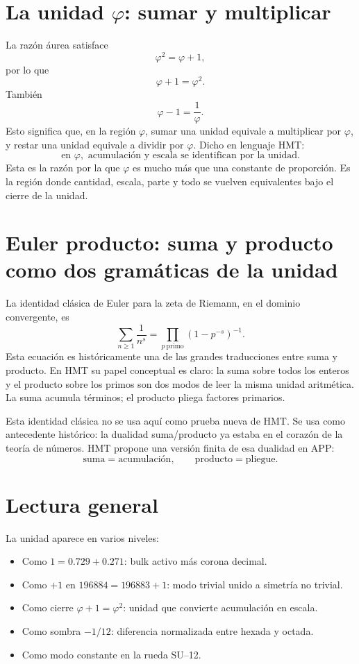 \documentclass[11pt,a4paper]{article}
\begin{document}
\section{La unidad \(\varphi\): sumar y multiplicar}
La raz\'on \'aurea satisface
\[
\varphi^2=\varphi+1,
\]
por lo que
\[
\boxed{\varphi+1=\varphi^2.}
\]
Tambi\'en
\[
\varphi-1=\frac1\varphi.
\]
Esto significa que, en la regi\'on \(\varphi\), sumar una unidad equivale a multiplicar por \(\varphi\), y restar una unidad equivale a dividir por \(\varphi\). Dicho en lenguaje HMT:
\[
\boxed{\text{en }\varphi,\text{ acumulaci\'on y escala se identifican por la unidad.}}
\]
Esta es la raz\'on por la que \(\varphi\) es mucho m\'as que una constante de proporci\'on. Es la regi\'on donde cantidad, escala, parte y todo se vuelven equivalentes bajo el cierre de la unidad.

\section{Euler producto: suma y producto como dos gram\'aticas de la unidad}
La identidad cl\'asica de Euler para la zeta de Riemann, en el dominio convergente, es
\[
\sum_{n\ge1}\frac{1}{n^s}
=
\prod_{p\ \mathrm{primo}}\left(1-p^{-s}\right)^{-1}.
\]
Esta ecuaci\'on es hist\'oricamente una de las grandes traducciones entre suma y producto. En HMT su papel conceptual es claro: la suma sobre todos los enteros y el producto sobre los primos son dos modos de leer la misma unidad aritm\'etica. La suma acumula t\'erminos; el producto pliega factores primarios.

Esta identidad cl\'asica no se usa aqu\'i como prueba nueva de HMT. Se usa como antecedente hist\'orico: la dualidad suma/producto ya estaba en el coraz\'on de la teor\'ia de n\'umeros. HMT propone una versi\'on finita de esa dualidad en APP:
\[
\boxed{\text{suma}=\text{acumulaci\'on},\qquad \text{producto}=\text{pliegue}.}
\]

\section{Lectura general}
La unidad aparece en varios niveles:
\begin{itemize}
\item Como \(1=0.729+0.271\): bulk activo m\'as corona decimal.
\item Como \(+1\) en \(196884=196883+1\): modo trivial unido a simetr\'ia no trivial.
\item Como cierre \(\varphi+1=\varphi^2\): unidad que convierte acumulaci\'on en escala.
\item Como sombra \(-1/12\): diferencia normalizada entre hexada y octada.
\item Como modo constante en la rueda SU--12.
\end{itemize}
\end{document}

